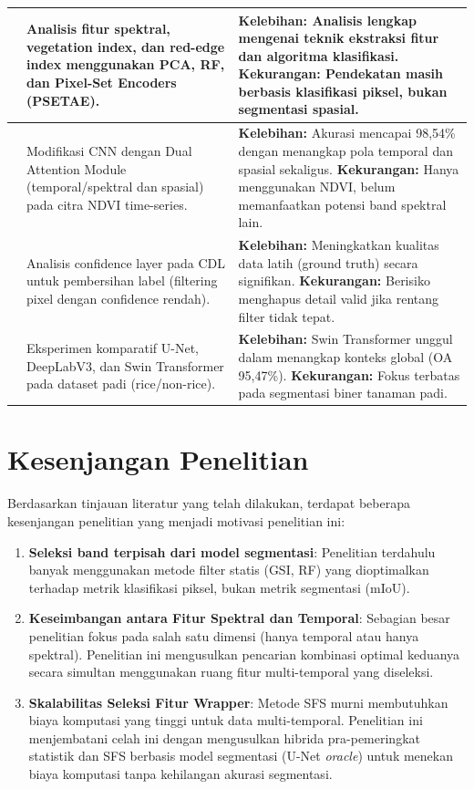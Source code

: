 \begin{table}[H]
\begin{tabularx}{\textwidth}{|l|X|X|}
    \cite{rs15215203} & Analisis fitur spektral, vegetation index, dan red-edge index menggunakan PCA, RF, dan Pixel-Set Encoders (PSETAE). & \textbf{Kelebihan:} Analisis lengkap mengenai teknik ekstraksi fitur dan algoritma klasifikasi. \textbf{Kekurangan:} Pendekatan masih berbasis klasifikasi piksel, bukan segmentasi spasial. \\ \hline
    \cite{seydi2022} & Modifikasi CNN dengan Dual Attention Module (temporal/spektral dan spasial) pada citra NDVI time-series. & \textbf{Kelebihan:} Akurasi mencapai 98,54\% dengan menangkap pola temporal dan spasial sekaligus. \textbf{Kekurangan:} Hanya menggunakan NDVI, belum memanfaatkan potensi band spektral lain. \\ \hline
    \cite{maleki2024} & Analisis confidence layer pada CDL untuk pembersihan label (filtering pixel dengan confidence rendah). & \textbf{Kelebihan:} Meningkatkan kualitas data latih (ground truth) secara signifikan. \textbf{Kekurangan:} Berisiko menghapus detail valid jika rentang filter tidak tepat. \\ \hline
    \cite{wu2025} & Eksperimen komparatif U-Net, DeepLabV3, dan Swin Transformer pada dataset padi (rice/non-rice). & \textbf{Kelebihan:} Swin Transformer unggul dalam menangkap konteks global (OA 95,47\%). \textbf{Kekurangan:} Fokus terbatas pada segmentasi biner tanaman padi. \\ \hline
    \end{tabularx}
\end{table}

\section{Kesenjangan Penelitian}
Berdasarkan tinjauan literatur yang telah dilakukan, terdapat beberapa kesenjangan penelitian yang menjadi motivasi penelitian ini:

\begin{enumerate}
    \item \textbf{Seleksi band terpisah dari model segmentasi}: Penelitian terdahulu banyak menggunakan metode filter statis (GSI, RF) yang dioptimalkan terhadap metrik klasifikasi piksel, bukan metrik segmentasi (mIoU).
    \item \textbf{Keseimbangan antara Fitur Spektral dan Temporal}: Sebagian besar penelitian fokus pada salah satu dimensi (hanya temporal atau hanya spektral). Penelitian ini mengusulkan pencarian kombinasi optimal keduanya secara simultan menggunakan ruang fitur multi-temporal yang diseleksi.
    \item \textbf{Skalabilitas Seleksi Fitur Wrapper}: Metode SFS murni membutuhkan biaya komputasi yang tinggi untuk data multi-temporal. Penelitian ini menjembatani celah ini dengan mengusulkan hibrida pra-pemeringkat statistik dan SFS berbasis model segmentasi (U-Net \textit{oracle}) untuk menekan biaya komputasi tanpa kehilangan akurasi segmentasi.
\end{enumerate}

